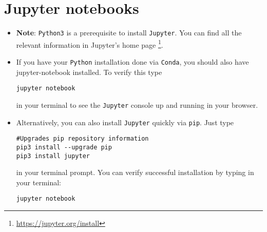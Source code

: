 \documentclass[11pt]{article}
\begin{document}
\section*{Jupyter notebooks}
\label{sec:orgc90a74c}
\begin{itemize}
\item \textbf{Note}: \texttt{Python3} is a prerequisite to install \texttt{Jupyter}. You can find all the
relevant information in Jupyter's home page \footnote{\url{https://jupyter.org/install}}.
\item If you have your \texttt{Python} installation done via \texttt{Conda}, you should also have
jupyter-notebook installed. To verify this type
\begin{verbatim}
jupyter notebook
\end{verbatim}
in your terminal to see the \texttt{Jupyter} console up and running in your browser.
\item Alternatively, you can also install \texttt{Jupyter} quickly via \texttt{pip}. Just type
\begin{verbatim}
#Upgrades pip repository information
pip3 install --upgrade pip
pip3 install jupyter
\end{verbatim}
in your terminal prompt. You can verify successful installation by typing in
your terminal:
\begin{verbatim}
jupyter notebook
\end{verbatim}
\end{itemize}
\end{document}
